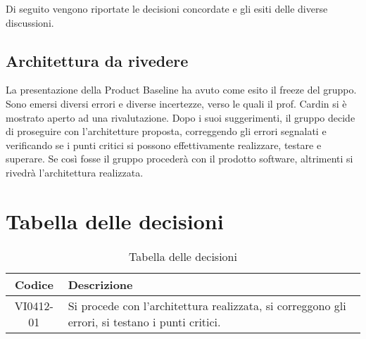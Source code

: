 \documentclass{article}
\begin{document}
Di seguito vengono riportate le decisioni concordate e gli esiti delle diverse discussioni.

\subsection{Architettura da rivedere}
\label{itm:1}

La presentazione della Product Baseline ha avuto come esito il freeze del gruppo. Sono emersi diversi errori e diverse incertezze, 
verso le quali il prof. Cardin si è mostrato aperto ad una rivalutazione. Dopo i suoi suggerimenti, il gruppo decide di proseguire 
con l'architetture proposta, correggendo gli errori segnalati e verificando se i punti critici si possono effettivamente realizzare, 
testare e superare. Se così fosse il gruppo procederà con il prodotto software, altrimenti si rivedrà l'architettura realizzata.


\section{Tabella delle decisioni}%
\label{sub:decisioni}

\begin{table}[!ht]
	\centering
	\begin{tabular}{|c|p{13cm}|}
		\hline
		\rowcolor{lightgray}
		\textbf{Codice} & \textbf{Descrizione} \\ 
		\hline
			VI0412-01 & Si procede con l'architettura realizzata, si correggono gli errori, si testano i punti critici. \\
		\hline
	\end{tabular}
	\caption{Tabella delle decisioni}
\end{table}
\end{document}
